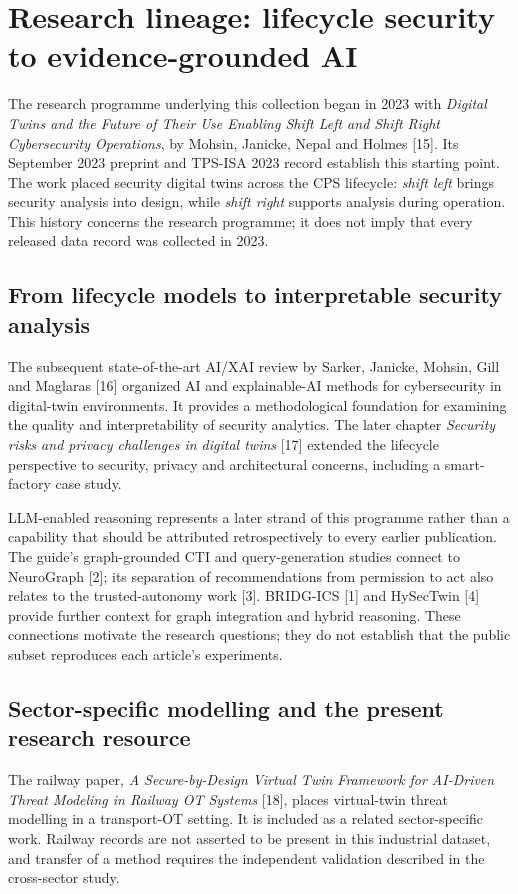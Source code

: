 \clearpage\section{Research lineage: lifecycle security to evidence-grounded AI}
The research programme underlying this collection began in 2023 with \textit{Digital Twins and the Future of Their Use Enabling Shift Left and Shift Right Cybersecurity Operations}, by Mohsin, Janicke, Nepal and Holmes [15]. Its September 2023 preprint and TPS-ISA 2023 record establish this starting point. The work placed security digital twins across the CPS lifecycle: \emph{shift left} brings security analysis into design, while \emph{shift right} supports analysis during operation. This history concerns the research programme; it does not imply that every released data record was collected in 2023.

\subsection*{From lifecycle models to interpretable security analysis}
The subsequent state-of-the-art AI/XAI review by Sarker, Janicke, Mohsin, Gill and Maglaras [16] organized AI and explainable-AI methods for cybersecurity in digital-twin environments. It provides a methodological foundation for examining the quality and interpretability of security analytics. The later chapter \textit{Security risks and privacy challenges in digital twins} [17] extended the lifecycle perspective to security, privacy and architectural concerns, including a smart-factory case study.

LLM-enabled reasoning represents a later strand of this programme rather than a capability that should be attributed retrospectively to every earlier publication. The guide's graph-grounded CTI and query-generation studies connect to NeuroGraph [2]; its separation of recommendations from permission to act also relates to the trusted-autonomy work [3]. BRIDG-ICS [1] and HySecTwin [4] provide further context for graph integration and hybrid reasoning. These connections motivate the research questions; they do not establish that the public subset reproduces each article's experiments.

\subsection*{Sector-specific modelling and the present research resource}
The railway paper, \textit{A Secure-by-Design Virtual Twin Framework for AI-Driven Threat Modeling in Railway OT Systems} [18], places virtual-twin threat modelling in a transport-OT setting. It is included as a related sector-specific work. Railway records are not asserted to be present in this industrial dataset, and transfer of a method requires the independent validation described in the cross-sector study.

